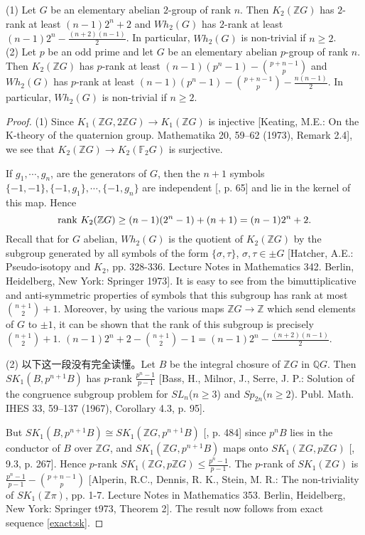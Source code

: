 \begin{theorem}
(1)	Let $G$ be an elementary abelian $2$-group of rank $n$. Then  $K_2(\mathbb{Z} G)$  has $2$-rank at least $(n-1)2^n+2$ and $Wh_2(G)$ has $2$-rank at least
$(n-1)2^n- \frac{(n+2)(n-1)}{2}$. In particular, $Wh_2(G)$ is non-trivial if $n \geq 2$.\\
(2) Let $p$ be an odd prime and let $G$ be an elementary abelian $p$-group of rank $n$. Then  $K_2(\mathbb{Z} G)$  has $p$-rank at least $(n-1)(p^n-1)-\binom{p+n-1}{p}$ and $Wh_2(G)$ has $p$-rank at least
$(n-1)(p^n-1)-\binom{p+n-1}{p}-\frac{n(n-1)}{2}$. In particular, $Wh_2(G)$ is non-trivial if $n \geq 2$.
\end{theorem}
\begin{proof}
	(1) Since  $K_1(\mathbb{Z}G, 2\mathbb{Z}G)\longrightarrow  K_1(\mathbb{Z}G)$ is injective [Keating, M.E.: On the K-theory of the quaternion group. Mathematika 20, 59--62 (1973), Remark 2.4], we see that
$K_2(\mathbb{Z}G)\longrightarrow K_2(\mathbb{F}_2 G)$  is surjective. 

If $g_1, \cdots, g_n$, are the generators of $G$, then the $n + 1$
symbols $\{- 1, - 1 \}, \{ - 1, g_1 \}, \cdots, \{ - 1, g_n\}$ are independent [\cite{MR50:2304}, p. 65] and lie in the kernel of this map. Hence 
\[\mathrm{rank\ } K_2(\mathbb{Z} G) \geq (n-1)(2^n-1)+(n+1) =(n-1)2^n +2. \]
Recall that for $G$ abelian, $Wh_2(G)$ is the quotient of $K_2(\mathbb{Z}G)$ by the subgroup generated by all symbols of the form $\{\sigma, \tau\}$, $\sigma,\tau \in \pm G$ [Hatcher, A.E.: Pseudo-isotopy and $K_2$,  pp. 328-336. Lecture Notes in Mathematics 342. Berlin, Heidelberg, New York: Springer 1973]. It is easy to see from the bimuttiplicative and anti-symmetric properties of symbols that this subgroup has rank at most $\binom{n+1}{2}+1$. Moreover, by using the various maps $\mathbb{Z}G\longrightarrow \mathbb{Z}$ which send elements of $G$ to $\pm 1$, it can be shown that the rank of this subgroup is precisely $\binom{n+1}{2}+1$. $(n-1)2^n+2-\binom{n+1}{2}-1=(n-1)2^n- \frac{(n+2)(n-1)}{2}$.

(2) {\color{red}以下这一段没有完全读懂。}Let $B$ be the integral chosure of $\mathbb{Z}G$ in $\mathbb{Q}G$. Then $SK_1(B, p^{n+1}B)$ has $p$-rank $\frac{p^n-1}{p-1}$ [Bass, H., Milnor, J., Serre, J. P.: Solution of the congruence subgroup problem for  $SL_n$($n \geq  3$) and
$Sp_{2n}$($n\geq 2$).  Publ. Math. IHES 33, 59--137 (1967), Corollary 4.3, p. 95].

But $SK_1(B, p^{n+1} B) \cong SK_1 (\mathbb{Z}G, p^{n+1} B)$ [\cite{MR40:2736}, p. 484]
since $p^nB$ lies in the conductor of $B$ over $\mathbb{Z}G$, and $SK_1(\mathbb{Z}G, p^{n+1}B)$ maps onto $SK_1(\mathbb{Z}G, p\mathbb{Z}G)$ [\cite{MR40:2736}, 9.3, p. 267]. Hence $p$-rank $SK_1(\mathbb{Z}G, p\mathbb{Z}G)\leq \frac{p^n-1}{p-1}$. The $p$-rank of $SK_1(\mathbb{Z}G)$ is $\frac{p^n-1}{p-1} - \binom{p+n-1}{p}$ [Alperin, R.C., Dennis, R. K., Stein, M. R.: The non-triviality of  $SK_1(\mathbb{Z}\pi)$, pp. 1-7. Lecture Notes in Mathematics 353. Berlin, Heidelberg, New York: Springer t973, Theorem 2]. The result now follows from exact sequence \ref{exact:sk}.


\end{proof}
